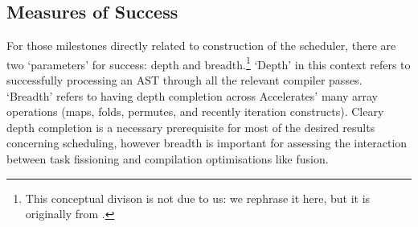 \documentclass[a4paper,12pt]{article}
\begin{document}
\subsection{Measures of Success}
For those milestones directly related to construction of the scheduler, there are two `parameters' for success: depth and breadth.\footnote{This conceptual divison is not due to us: we rephrase it here, but it is originally from \citet{newton_converting_2014}.} 
`Depth' in this context refers to successfully processing an AST through all the relevant compiler passes. 
`Breadth' refers to having depth completion across Accelerates' many array operations (maps, folds, permutes, and recently iteration constructs).
Cleary depth completion is a necessary prerequisite for most of the desired results concerning scheduling, however breadth is important for assessing the interaction between task fissioning and compilation optimisations like fusion.

\pagebreak



\end{document}
